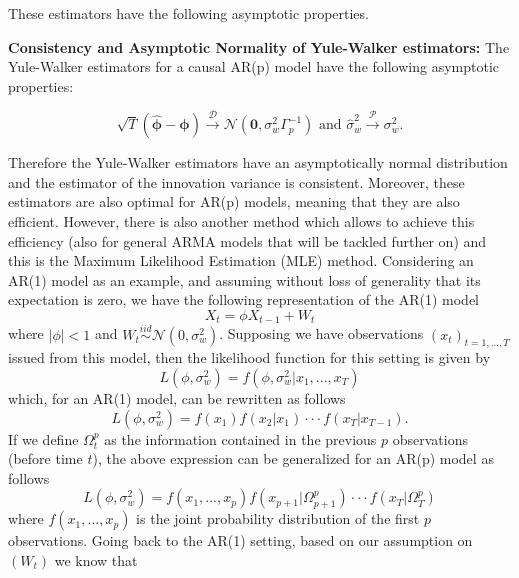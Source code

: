 \documentclass[]{book}
\theoremstyle{definition}
\theoremstyle{definition}
\theoremstyle{definition}
\theoremstyle{remark}
\begin{document}
These estimators have the following asymptotic properties.

\textbf{Consistency and Asymptotic Normality of Yule-Walker estimators:}
The Yule-Walker estimators for a causal AR(p) model have the following
asymptotic properties:

\begin{equation*}
\sqrt{T}(\hat{\mathbf{\phi}}- \mathbf{\phi}) \xrightarrow{\mathcal{D}} \mathcal{N}(\mathbf{0},\sigma_w^2\Gamma_p^{-1}) \,\, \text{and} \,\, \hat{\sigma}_w^2 \xrightarrow{\mathcal{P}} \sigma_w^2 .
\end{equation*}

Therefore the Yule-Walker estimators have an asymptotically normal
distribution and the estimator of the innovation variance is consistent.
Moreover, these estimators are also optimal for AR(p) models, meaning
that they are also efficient. However, there is also another method
which allows to achieve this efficiency (also for general ARMA models
that will be tackled further on) and this is the Maximum Likelihood
Estimation (MLE) method. Considering an AR(1) model as an example, and
assuming without loss of generality that its expectation is zero, we
have the following representation of the AR(1) model \begin{equation*}
X_t = \phi X_{t-1} + W_t
\end{equation*} where \(|\phi|<1\) and
\(W_t \overset{iid}{\sim} \mathcal{N}(0,\sigma_w^2)\). Supposing we have
observations \((x_t)_{t=1,...,T}\) issued from this model, then the
likelihood function for this setting is given by \begin{equation*}
L(\phi,\sigma_w^2) = f(\phi,\sigma_w^2|x_1,...,x_T)
\end{equation*} which, for an AR(1) model, can be rewritten as follows
\begin{equation*}
L(\phi,\sigma_w^2) = f(x_1)f(x_2|x_1)\cdot \cdot \cdot f(x_T|x_{T-1}).
\end{equation*} If we define \(\Omega_t^p\) as the information contained
in the previous \(p\) observations (before time \(t\)), the above
expression can be generalized for an AR(p) model as follows
\begin{equation*}
L(\phi,\sigma_w^2) = f(x_1,...,x_p)f(x_{p+1}|\Omega_{p+1}^p)\cdot \cdot \cdot f(x_T|\Omega_{T}^p)
\end{equation*} where \(f(x_1,...,x_p)\) is the joint probability
distribution of the first \(p\) observations. Going back to the AR(1)
setting, based on our assumption on \((W_t)\) we know that
\end{document}
